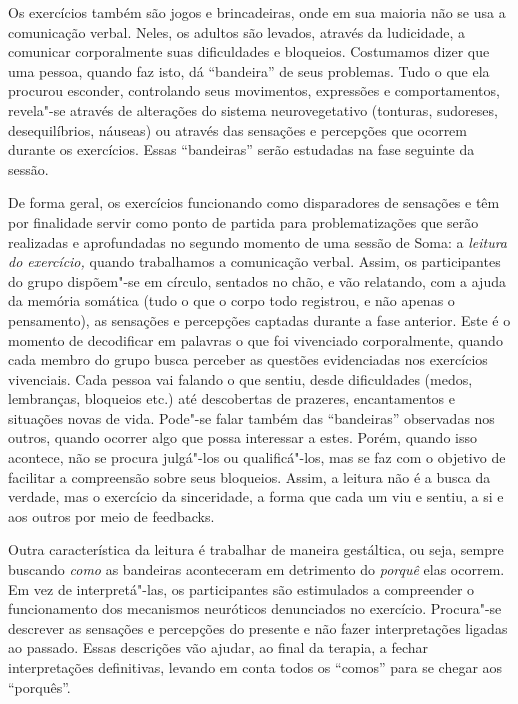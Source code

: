 Os exercícios também são jogos e brincadeiras, onde em sua maioria não
se usa a comunicação verbal. Neles, os adultos são levados, através da
ludicidade, a comunicar corporalmente suas dificuldades e bloqueios.
Costumamos dizer que uma pessoa, quando faz isto, dá ``bandeira'' de
seus problemas. Tudo o que ela procurou esconder, controlando seus
movimentos, expressões e comportamentos, revela"-se através de alterações
do sistema neurovegetativo (tonturas, sudoreses, desequilíbrios,
náuseas) ou através das sensações e percepções que ocorrem durante os
exercícios. Essas ``bandeiras'' serão estudadas na fase seguinte da
sessão.

De forma geral, os exercícios funcionando como disparadores de sensações
e têm por finalidade servir como ponto de partida para problematizações
que serão realizadas e aprofundadas no segundo momento de uma sessão de
Soma: a \emph{leitura do exercício,} quando trabalhamos a comunicação
verbal. Assim, os participantes do grupo dispõem"-se em círculo, sentados
no chão, e vão relatando, com a ajuda da memória somática (tudo o que o
corpo todo registrou, e não apenas o pensamento), as sensações e
percepções captadas durante a fase anterior. Este é o momento de
decodificar em palavras o que foi vivenciado corporalmente, quando cada
membro do grupo busca perceber as questões evidenciadas nos exercícios
vivenciais. Cada pessoa vai falando o que sentiu, desde dificuldades
(medos, lembranças, bloqueios etc.) até descobertas de prazeres,
encantamentos e situações novas de vida. Pode"-se falar também das
``bandeiras'' observadas nos outros, quando ocorrer algo que possa
interessar a estes. Porém, quando isso acontece, não se procura
julgá"-los ou qualificá"-los, mas se faz com o objetivo de facilitar a
compreensão sobre seus bloqueios. Assim, a leitura não é a busca da
verdade, mas o exercício da sinceridade, a forma que cada um viu e
sentiu, a si e aos outros por meio de feedbacks.

Outra característica da leitura é trabalhar de maneira gestáltica, ou
seja, sempre buscando \emph{como} as bandeiras aconteceram em detrimento
do \emph{porquê} elas ocorrem. Em vez de interpretá"-las, os
participantes são estimulados a compreender o funcionamento dos
mecanismos neuróticos denunciados no exercício. Procura"-se descrever as
sensações e percepções do presente e não fazer interpretações ligadas ao
passado. Essas descrições vão ajudar, ao final da terapia, a fechar
interpretações definitivas, levando em conta todos os ``comos'' para se
chegar aos ``porquês''.

